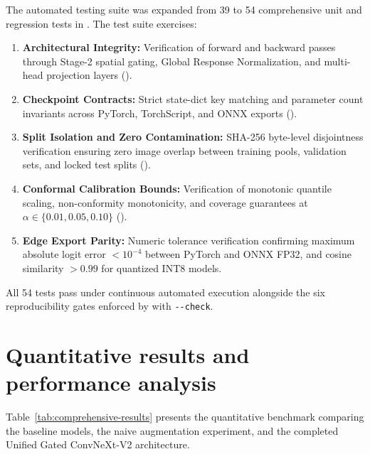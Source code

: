 \documentclass[12pt,a4paper]{report}
\begin{document}
The automated testing suite was expanded from 39 to 54 comprehensive unit and regression tests in
. The test suite exercises:
\begin{enumerate}[leftmargin=1.4em,itemsep=3pt]
\item \textbf{Architectural Integrity:} Verification of forward and backward passes through Stage-2
      spatial gating, Global Response Normalization, and multi-head projection layers
      ().
\item \textbf{Checkpoint Contracts:} Strict state-dict key matching and parameter count invariants
      across PyTorch, TorchScript, and ONNX exports ().
\item \textbf{Split Isolation and Zero Contamination:} SHA-256 byte-level disjointness verification
      ensuring zero image overlap between training pools, validation sets, and locked test splits
      ().
\item \textbf{Conformal Calibration Bounds:} Verification of monotonic quantile scaling, non-conformity
      monotonicity, and coverage guarantees at $\alpha \in \{0.01, 0.05, 0.10\}$
      ().
\item \textbf{Edge Export Parity:} Numeric tolerance verification confirming maximum absolute logit error
      $< 10^{-4}$ between PyTorch and ONNX FP32, and cosine similarity $> 0.99$ for quantized INT8 models.
\end{enumerate}

All 54 tests pass under continuous automated execution alongside the six reproducibility gates
enforced by  with \texttt{-{}-check}.

\section{Quantitative results and performance analysis}

Table~\ref{tab:comprehensive-results} presents the quantitative benchmark comparing the baseline models,
the naive augmentation experiment, and the completed Unified Gated ConvNeXt-V2 architecture.
\end{document}
